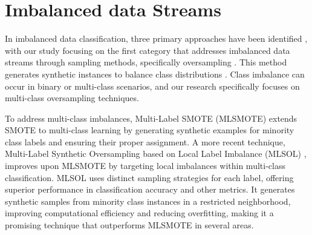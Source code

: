 %
%
\section{Imbalanced data Streams}
\label{sec:3_3_imbalanced}
In imbalanced data classification, three primary approaches have been identified \cite{yin2022graph}, with our study focusing on the first category that addresses imbalanced data streams through sampling methods, specifically oversampling \cite{ren2023grouping}. This method generates synthetic instances to balance class distributions \cite{nitesh2002smote, han2005borderline, bunkhumpornpat2009safe, maciejewski2011local}. Class imbalance can occur in binary or multi-class scenarios, and our research specifically focuses on multi-class oversampling techniques.

To address multi-class imbalances, Multi-Label SMOTE (MLSMOTE) \cite{charte2015mlsmote} extends SMOTE to multi-class learning by generating synthetic examples for minority class labels and ensuring their proper assignment. A more recent technique, Multi-Label Synthetic Oversampling based on Local Label Imbalance (MLSOL) \cite{yin2022graph}, improves upon MLSMOTE by targeting local imbalances within multi-class classification. MLSOL uses distinct sampling strategies for each label, offering superior performance in classification accuracy and other metrics. It generates synthetic samples from minority class instances in a restricted neighborhood, improving computational efficiency and reducing overfitting, making it a promising technique that outperforms MLSMOTE in several areas.